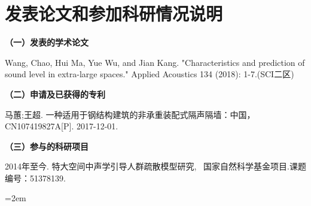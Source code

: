 
\setcounter{secnumdepth}{-2}
\chapter{发表论文和参加科研情况说明}
\setlength{\parindent}{0em}

\textbf{（一）发表的学术论文}
\begin{publist}
\item  Wang, Chao, Hui Ma, Yue Wu, and Jian Kang. "Characteristics and prediction of sound level in extra-large spaces." Applied Acoustics 134 (2018): 1-7.(SCI二区)

\end{publist}

\textbf{（二）申请及已获得的专利}
\begin{publist}
\item 马蕙;王超. 一种适用于钢结构建筑的非承重装配式隔声隔墙：中国，CN107419827A[P]. 2017-12-01.

\end{publist}
\textbf{（三）参与的科研项目}
\begin{publist}
\item	2014年至今. 特大空间中声学引导人群疏散模型研究, ~国家自然科学基金项目.课题编号：51378139.
\end{publist}
\vfill
{}\hangindent=2em\noindent

\setlength{\parindent}{2em}
